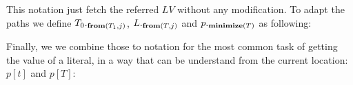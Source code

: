This notation just fetch the referred $LV$ without any modification.
To adapt the paths we define $T_0{._{\textbf{from}({T_1,j})}}$, $L{._{\textbf{from}({T,j})}}$ and $p{._{\textbf{minimize}({T})}}$ as following:
\begin{defye}%
%
%
%
%
%
\end{defye}

\noindent Finally, we we combine those to notation for the
most common task of getting the value of a literal, in a way that can be understand from the current location: $p[t]$ and $p[T]$:
\begin{defye}%
\end{defye}
\\${}_{}$\\
